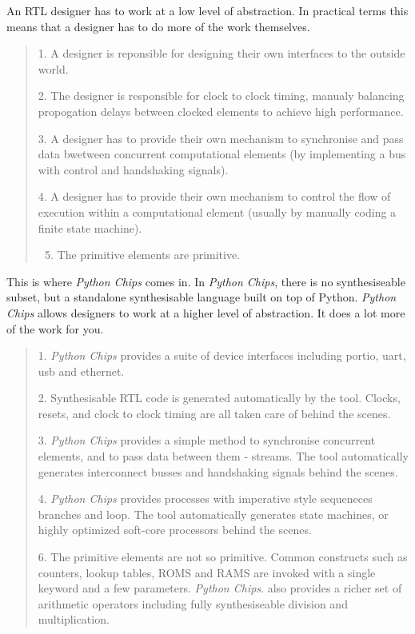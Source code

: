 \documentclass[letterpaper,10pt,english]{manual}
\begin{document}
An RTL designer has to work at a low level of abstraction. In practical terms
this means that a designer has to do more of the work themselves.
\begin{quote}

1. A designer is reponsible for designing their own interfaces to the
outside world.

2. The designer is responsible for clock to clock timing, manualy
balancing propogation delays between clocked elements to achieve high
performance.

3. A designer has to provide their own mechanism to synchronise and
pass data bwetween concurrent computational elements (by implementing a
bus with control and handshaking signals).

4. A designer has to provide their own mechanism to control the flow of
execution within a computational element (usually by manually coding a
finite state machine).
\begin{enumerate}
\setcounter{enumi}{4}
\item {} 
The primitive elements are primitive.

\end{enumerate}
\end{quote}

This is where \emph{Python Chips} comes in. In \emph{Python Chips}, there is no
synthesiseable subset, but a standalone synthesisable language built on top of
Python. \emph{Python Chips} allows designers to work at a higher level of
abstraction. It does a lot more of the work for you.
\begin{quote}

1. \emph{Python Chips} provides a suite of device interfaces including portio,
uart, usb and ethernet.

2. Synthesisable RTL code is generated automatically by the tool. Clocks,
resets, and clock to clock timing are all taken care of behind the scenes.

3. \emph{Python Chips} provides a simple method to synchronise concurrent
elements, and to pass data between them - streams. The tool automatically
generates interconnect busses and handshaking signals behind the scenes.

4. \emph{Python Chips} provides processes with imperative style sequeneces
branches and loop. The tool automatically generates state machines, or highly
optimized soft-core processors behind the scenes.

6. The primitive elements are not so primitive. Common constructs such as
counters, lookup tables, ROMS and RAMS are invoked with a single keyword and a
few parameters. \emph{Python Chips}. also provides a richer set of arithmetic
operators including fully synthesiseable division and multiplication.
\end{quote}
\end{document}
